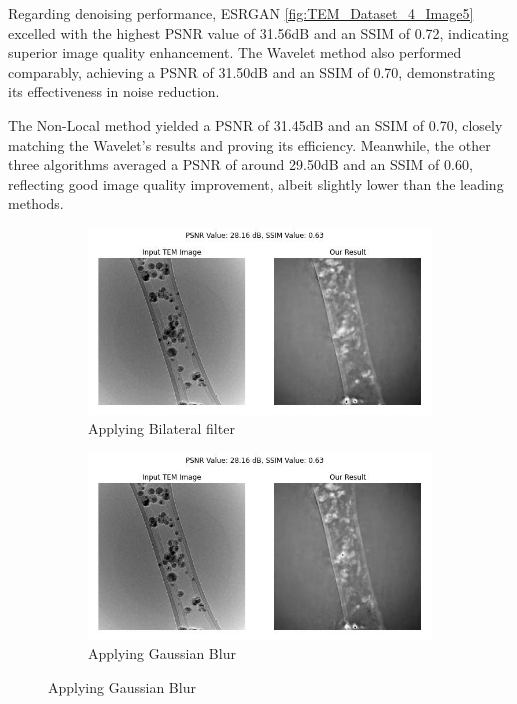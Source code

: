 Regarding denoising performance, ESRGAN \ref{fig:TEM_Dataset_4_Image5} excelled with the highest PSNR value of 31.56dB and an SSIM of 0.72, indicating superior image quality enhancement. The Wavelet method also performed comparably, achieving a PSNR of 31.50dB and an SSIM of 0.70, demonstrating its effectiveness in noise reduction.
\vspace{10pt}

The Non-Local method yielded a PSNR of 31.45dB and an SSIM of 0.70, closely matching the Wavelet's results and proving its efficiency. Meanwhile, the other three algorithms averaged a PSNR of around 29.50dB and an SSIM of 0.60, reflecting good image quality improvement, albeit slightly lower than the leading methods.


\begin{figure}[H]
    \centering
    \begin{subfigure}{.47\textwidth} %
        \includegraphics[width=\textwidth]{img/Results/Dataset_4/Dataset_4_bilateral_filter.jpg}
        \caption{Applying Bilateral filter}
        \label{fig:Image1}
    \end{subfigure}
    \hfill
    \begin{subfigure}{.47\textwidth} %
        \includegraphics[width=\textwidth]{img/Results/Dataset_4/Dataset_4_gaussian_blur.jpg}
        \caption{Applying Gaussian Blur}
        \label{fig:Image2}
    \end{subfigure}
    

\end{figure}
